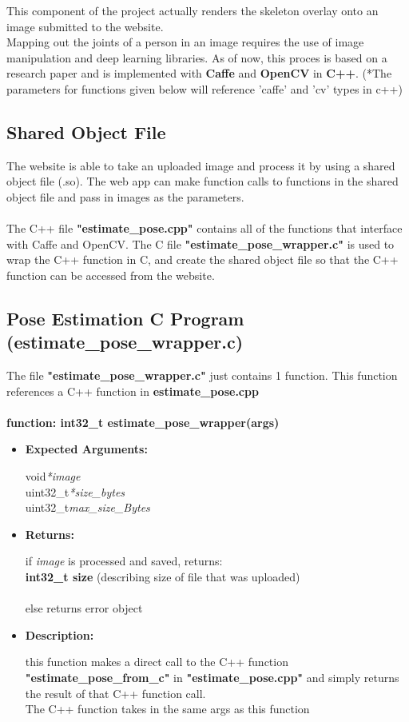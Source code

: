 \documentclass{scrreprt}
\begin{document}
This component of the project actually renders the skeleton overlay onto an image submitted to the website.
\\
Mapping out the joints of a person in an image requires the use of image manipulation and deep learning libraries. As of now, this proces is based on a research paper and is implemented with \textbf{Caffe} and \textbf{OpenCV} in \textbf{C++}. (*The parameters for functions given below will reference 'caffe' and 'cv' types in c++)



\subsection{Shared Object File}

The website is able to take an uploaded image and process it by using a shared object file (.so). The web app can make function calls to functions in the shared object file and pass in images as the parameters.
\\\\
The C++ file \textbf{"estimate\_pose.cpp"} contains all of the functions that interface with Caffe and OpenCV. The C file \textbf{"estimate\_pose\_wrapper.c"} is used to wrap the C++ function in C, and create the shared object file so that the C++ function can be accessed from the website.

\subsection{Pose Estimation C Program (estimate\_pose\_wrapper.c)}
The file \textbf{"estimate\_pose\_wrapper.c"} just contains 1 function. This function references a C++ function in \textbf{estimate\_pose.cpp}
\\\\
\textbf{function: int32\_t estimate\_pose\_wrapper(args)}
\begin{itemize}
    \item \textbf{Expected Arguments:}

    void\quad\textit{*image}
    \\
    uint32\_t\quad\textit{*size\_bytes}
    \\
    uint32\_t\quad\textit{max\_size\_Bytes}

    \item\quad\textbf{Returns:}

    if \textit{image} is processed and saved, returns:\\\textbf{int32\_t size}
    (describing size of file that was uploaded)
    \\\\
    else returns error object

    \item \textbf{Description:}

    this function makes a direct call to the C++ function \textbf{"estimate\_pose\_from\_c"} in \textbf{"estimate\_pose.cpp"} and simply returns the result of that C++ function call.
    \\
    The C++ function takes in the same args as this function
\end{itemize}
\end{document}
